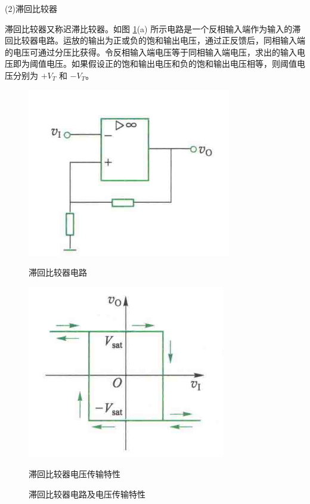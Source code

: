 \documentclass[10pt, a4paper]{article} %
\begin{document}
(2)滞回比较器

滞回比较器又称迟滞比较器。如图 \ref{fig:hysteresis}(a) 所示电路是一个反相输入端作为输入的滞回比较器电路。运放的输出为正或负的饱和输出电压，通过正反馈后，同相输入端的电压可通过分压比获得。令反相输入端电压等于同相输入端电压，求出的输入电压即为阈值电压。如果假设正的饱和输出电压和负的饱和输出电压相等，则阈值电压分别为 $+V_T$ 和 $-V_T$。

\begin{figure}[htbp]
    \centering
    \begin{minipage}{0.45\textwidth}
        \centering
        \includegraphics[width=\textwidth]{image/5.png}
        \caption{滞回比较器电路}
    \end{minipage}
    \hfill
    \begin{minipage}{0.45\textwidth}
        \centering
        \includegraphics[width=\textwidth]{image/6.png}
        \caption{滞回比较器电压传输特性}
    \end{minipage}
    \caption{滞回比较器电路及电压传输特性}
    \label{fig:hysteresis}
\end{figure}
\end{document}
